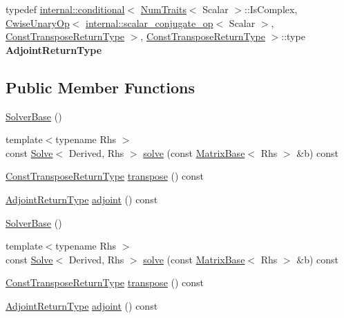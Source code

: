 \begin{DoxyCompactItemize}
\item 
\mbox{\label{class_eigen_1_1_solver_base_a8fd44c45359c0102af1a47752c2b8c82}} 
typedef \hyperlink{struct_eigen_1_1internal_1_1conditional}{internal\+::conditional}$<$ \hyperlink{group___core___module_struct_eigen_1_1_num_traits}{Num\+Traits}$<$ Scalar $>$\+::Is\+Complex, \hyperlink{group___core___module_class_eigen_1_1_cwise_unary_op}{Cwise\+Unary\+Op}$<$ \hyperlink{struct_eigen_1_1internal_1_1scalar__conjugate__op}{internal\+::scalar\+\_\+conjugate\+\_\+op}$<$ Scalar $>$, \hyperlink{group___core___module_class_eigen_1_1_transpose}{Const\+Transpose\+Return\+Type} $>$, \hyperlink{group___core___module_class_eigen_1_1_transpose}{Const\+Transpose\+Return\+Type} $>$\+::type {\bfseries Adjoint\+Return\+Type}
\end{DoxyCompactItemize}
\subsection*{Public Member Functions}
\begin{DoxyCompactItemize}
\item 
\hyperlink{class_eigen_1_1_solver_base_a4d5e5baddfba3790ab1a5f247dcc4dc1}{Solver\+Base} ()
\item 
{\footnotesize template$<$typename Rhs $>$ }\\const \hyperlink{group___core___module_class_eigen_1_1_solve}{Solve}$<$ Derived, Rhs $>$ \hyperlink{class_eigen_1_1_solver_base_a7fd647d110487799205df6f99547879d}{solve} (const \hyperlink{group___core___module_class_eigen_1_1_matrix_base}{Matrix\+Base}$<$ Rhs $>$ \&b) const
\item 
\hyperlink{group___core___module_class_eigen_1_1_transpose}{Const\+Transpose\+Return\+Type} \hyperlink{class_eigen_1_1_solver_base_a732e75b5132bb4db3775916927b0e86c}{transpose} () const
\item 
\hyperlink{class_eigen_1_1internal_1_1_tensor_lazy_evaluator_writable}{Adjoint\+Return\+Type} \hyperlink{class_eigen_1_1_solver_base_a05a3686a89888681c8e0c2bcab6d1ce5}{adjoint} () const
\item 
\hyperlink{class_eigen_1_1_solver_base_a4d5e5baddfba3790ab1a5f247dcc4dc1}{Solver\+Base} ()
\item 
{\footnotesize template$<$typename Rhs $>$ }\\const \hyperlink{group___core___module_class_eigen_1_1_solve}{Solve}$<$ Derived, Rhs $>$ \hyperlink{class_eigen_1_1_solver_base_a7fd647d110487799205df6f99547879d}{solve} (const \hyperlink{group___core___module_class_eigen_1_1_matrix_base}{Matrix\+Base}$<$ Rhs $>$ \&b) const
\item 
\hyperlink{group___core___module_class_eigen_1_1_transpose}{Const\+Transpose\+Return\+Type} \hyperlink{class_eigen_1_1_solver_base_a732e75b5132bb4db3775916927b0e86c}{transpose} () const
\item 
\hyperlink{class_eigen_1_1internal_1_1_tensor_lazy_evaluator_writable}{Adjoint\+Return\+Type} \hyperlink{class_eigen_1_1_solver_base_a05a3686a89888681c8e0c2bcab6d1ce5}{adjoint} () const
\end{DoxyCompactItemize}



